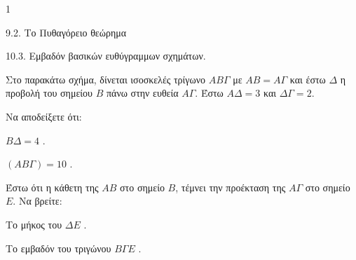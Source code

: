 \begin{ylh}{1}
    \item 9.2. Το Πυθαγόρειο θεώρημα
    \item 10.3. Εμβαδόν βασικών ευθύγραμμων σχημάτων.
\end{ylh}
\begin{figure}
\end{figure}
Στο παρακάτω σχήμα, δίνεται ισοσκελές τρίγωνο $AB\Gamma$ με $AB = A\Gamma$ και έστω $\Delta$ η προβολή του σημείου $B$ πάνω στην ευθεία $A\Gamma$. Έστω $A\Delta = 3$ και $\Delta\Gamma = 2$.

\begin{alist}
\item Να αποδείξετε ότι:
    \begin{rlist}
    \item $B\Delta = 4$ . 
    \item $(AB\Gamma) = 10$ . 
    \end{rlist}
\item Έστω ότι η κάθετη της $AB$ στο σημείο $B$, τέμνει την προέκταση της $A\Gamma$ στο σημείο $E$.
Να βρείτε:
    \begin{rlist}
    \item Το μήκος του $\Delta E$ . 
    \item Το εμβαδόν του τριγώνου $B\Gamma E$ . 
    \end{rlist}
\end{alist}